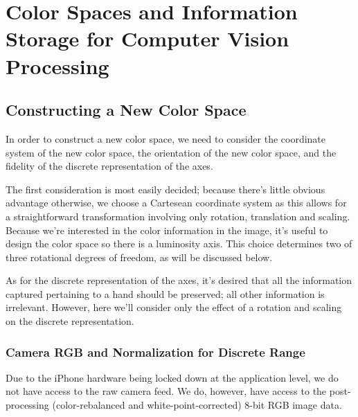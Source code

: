 

\chapter{Color Spaces and Information Storage for Computer Vision Processing} \label{sec:Chap2}

\ifpdf
    \graphicspath{{Chapter2/Figs/Raster/}{Chapter2/Figs/PDF/}{Chapter2/Figs/}}
\else
    \graphicspath{{Chapter2/Figs/Vector/}{Chapter2/Figs/}}
\fi


\section{Constructing a New Color Space}\label{sec:ConstructingANewColorSpace}

In order to construct a new color space, we need to consider the coordinate system of the new color space, the orientation of the new color space, and the fidelity of the discrete representation of the axes.

The first consideration is most easily decided; because there's little obvious advantage otherwise, we choose a Cartesean coordinate system as this allows for a straightforward transformation involving only rotation, translation and scaling. Because we're interested in the color information in the image, it's useful to design the color space so there is a luminosity axis. This choice determines two of three rotational degrees of freedom, as will be discussed below.

As for the discrete representation of the axes, it's desired that all the information captured pertaining to a hand should be preserved; all other information is irrelevant. However, here we'll consider only the effect of a rotation and scaling on the discrete representation.


\subsection{Camera RGB and Normalization for Discrete Range}\label{sec:CameraRGB}

Due to the iPhone hardware being locked down at the application level, we do not have access to the raw camera feed. We do, however, have access to the post-processing (color-rebalanced and white-point-corrected) 8-bit RGB image data.

